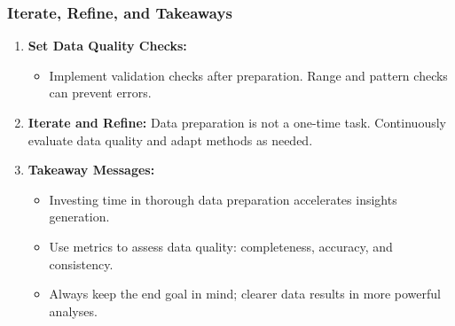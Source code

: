 \documentclass{beamer}
\begin{document}
\begin{frame}[fragile]
    \frametitle{Iterate, Refine, and Takeaways}
    \begin{enumerate}
        \item \textbf{Set Data Quality Checks:}
        \begin{itemize}
            \item Implement validation checks after preparation. Range and pattern checks can prevent errors.
        \end{itemize}
        
        \item \textbf{Iterate and Refine:} Data preparation is not a one-time task. Continuously evaluate data quality and adapt methods as needed.
        
        \item \textbf{Takeaway Messages:}
        \begin{itemize}
            \item Investing time in thorough data preparation accelerates insights generation.
            \item Use metrics to assess data quality: completeness, accuracy, and consistency.
            \item Always keep the end goal in mind; clearer data results in more powerful analyses.
        \end{itemize}
    \end{enumerate}
\end{frame}
\end{document}
